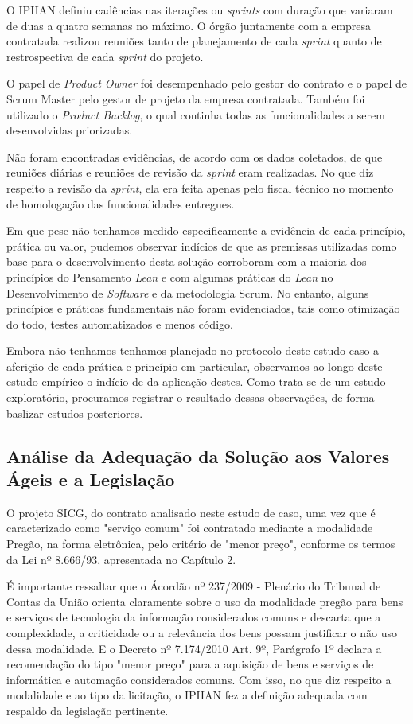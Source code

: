 O IPHAN definiu cadências nas iterações ou \textit{sprints} com duração que variaram de duas a quatro semanas no máximo. O órgão juntamente com a empresa contratada realizou reuniões tanto de planejamento de cada \textit{sprint} quanto de restrospectiva de cada \textit{sprint} do projeto. 

O papel de \textit{Product Owner} foi desempenhado pelo gestor do contrato e o papel de Scrum Master pelo gestor de projeto da empresa contratada. Também foi utilizado o \textit{Product Backlog}, o qual continha todas as funcionalidades a serem desenvolvidas priorizadas. 

Não foram encontradas evidências, de acordo com os dados coletados, de que reuniões diárias e reuniões de revisão da \textit{sprint} eram realizadas. No que diz respeito a revisão da \textit{sprint}, ela era feita apenas pelo fiscal técnico no momento de homologação das funcionalidades entregues.

Em que pese não tenhamos medido especificamente a evidência de cada princípio, prática ou valor, pudemos observar indícios de que as premissas utilizadas como base para o desenvolvimento desta solução corroboram com a maioria dos princípios do Pensamento \textit{Lean} e com algumas práticas do \textit{Lean} no Desenvolvimento de \textit{Software} e da metodologia Scrum. No entanto, alguns princípios e práticas fundamentais não foram evidenciados, tais como otimização do todo, testes automatizados e menos código. 

Embora não tenhamos tenhamos planejado no protocolo deste estudo caso a aferição de cada prática e princípio em particular, observamos ao longo deste estudo empírico o indício de da aplicação destes. Como trata-se de um estudo exploratório, procuramos registrar o resultado dessas observações, de forma baslizar estudos posteriores.


\subsection[Análise da Adequação da Solução aos Valores Ágeis e a Legislação]{Análise da Adequação da Solução aos Valores Ágeis e a Legislação}

O projeto SICG, do contrato analisado neste estudo de caso, uma vez que é caracterizado como "serviço comum" foi contratado mediante a modalidade Pregão, na forma eletrônica, pelo critério de "menor preço", conforme os termos da Lei nº 8.666/93, apresentada no Capítulo 2.

É importante ressaltar que o Ácordão nº 237/2009 - Plenário do Tribunal de Contas da União orienta claramente sobre o uso da modalidade pregão para bens e serviços de tecnologia da informação considerados comuns e descarta que a complexidade, a criticidade ou a relevância dos bens possam justificar o não uso dessa modalidade.  E o Decreto nº 7.174/2010 Art. 9º, Parágrafo 1º declara a recomendação do tipo "menor preço" para a aquisição de bens e serviços de informática e automação considerados comuns. Com isso, no que diz respeito a modalidade e ao tipo da licitação, o IPHAN fez a definição adequada com respaldo da legislação pertinente. 

